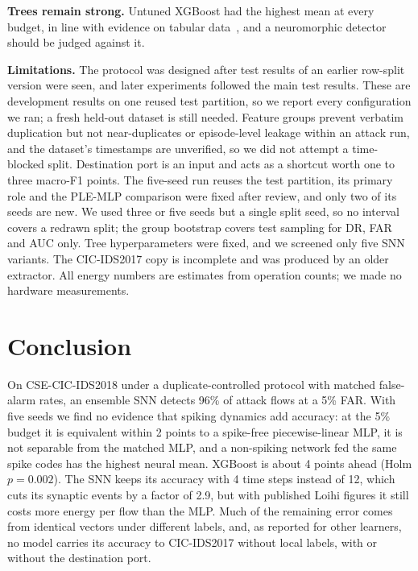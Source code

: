 \documentclass[conference]{IEEEtran}
\begin{document}
\textbf{Trees remain strong.} Untuned XGBoost had the highest mean at every budget, in line with evidence on tabular data~\cite{grinsztajn2022,shwartzziv2022}, and a neuromorphic detector should be judged against it.

\textbf{Limitations.} The protocol was designed after test results of an earlier row-split version were seen, and later experiments followed the main test results. These are development results on one reused test partition, so we report every configuration we ran; a fresh held-out dataset is still needed. Feature groups prevent verbatim duplication but not near-duplicates or episode-level leakage within an attack run, and the dataset's timestamps are unverified, so we did not attempt a time-blocked split. Destination port is an input and acts as a shortcut worth one to three macro-F1 points. The five-seed run reuses the test partition, its primary role and the PLE-MLP comparison were fixed after review, and only two of its seeds are new. We used three or five seeds but a single split seed, so no interval covers a redrawn split; the group bootstrap covers test sampling for DR, FAR and AUC only. Tree hyperparameters were fixed, and we screened only five SNN variants. The CIC-IDS2017 copy is incomplete and was produced by an older extractor. All energy numbers are estimates from operation counts; we made no hardware measurements.

\section{Conclusion}

On CSE-CIC-IDS2018 under a duplicate-controlled protocol with matched false-alarm rates, an ensemble SNN detects 96\% of attack flows at a 5\% FAR. With five seeds we find no evidence that spiking dynamics add accuracy: at the 5\% budget it is equivalent within 2 points to a spike-free piecewise-linear MLP, it is not separable from the matched MLP, and a non-spiking network fed the same spike codes has the highest neural mean. XGBoost is about 4 points ahead (Holm $p = 0.002$). The SNN keeps its accuracy with 4 time steps instead of 12, which cuts its synaptic events by a factor of 2.9, but with published Loihi figures it still costs more energy per flow than the MLP. Much of the remaining error comes from identical vectors under different labels, and, as reported for other learners, no model carries its accuracy to CIC-IDS2017 without local labels, with or without the destination port.
\end{document}

